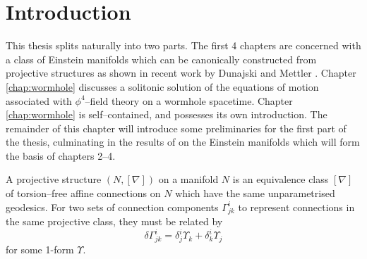 

\chapter{Introduction}\label{chap:intro}


This thesis splits naturally into two parts. The first 4 chapters are concerned with a class of Einstein manifolds which can be canonically constructed from projective structures as shown in recent work by Dunajski and Mettler \cite{DM}. Chapter \ref{chap:wormhole} discusses a solitonic solution of the equations of motion associated with $\phi^4$--field theory on a wormhole spacetime. Chapter \ref{chap:wormhole} is self--contained, and possesses its own introduction. The remainder of this chapter will introduce some preliminaries for the first part of the thesis, culminating in the results of \cite{DM} on the Einstein manifolds which will form the basis of chapters 2--4.




\begin{defi} A projective structure $(N,[\nabla])$
on a manifold $N$ is an equivalence class $[\nabla]$ of torsion--free affine connections
on $N$ which have the same unparametrised geodesics. For two sets
of connection components $\Gamma_{jk}^{i}$ to represent connections
in the same projective class, they must be related by
\begin{equation}
\delta\Gamma_{jk}^{i}=\delta_{j}^{i}\Upsilon_{k}+\delta_{k}^{i}\Upsilon_{j}\label{eq:proj_change}
\end{equation}
for some 1-form $\Upsilon.$
\end{defi}

